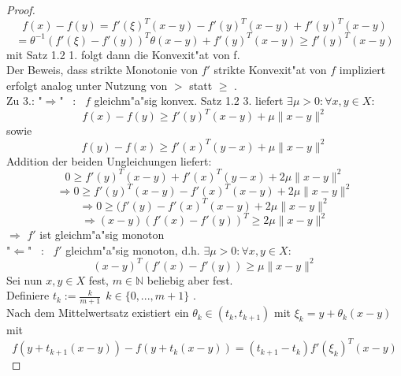 \begin{proof}
		\begin{equation*}
		f(x)-f(y)=f'(\xi)^T(x-y)-f'(y)^T(x-y)+f'(y)^T(x-y)
		\end{equation*}
		\begin{equation*}
		=\theta^{-1}(f'(\xi)-f'(y))^T\theta(x-y)+f'(y)^T(x-y) \geq f'(y)^T(x-y)
		\end{equation*}
		mit Satz 1.2 1. folgt dann die Konvexit"at von f. \\
		Der Beweis, dass strikte Monotonie von $f'$ strikte Konvexit"at von $f$ impliziert erfolgt analog unter Nutzung von \(>\) statt  \( \geq \) . \\
		Zu 3.: 
		"$\Rightarrow$" \ : \ $f$ gleichm"a"sig konvex. Satz 1.2 3. liefert $\exists \mu > 0 : \forall x,y \in X:$
		\begin{equation*}
		f(x)-f(y) \geq f'(y)^T(x-y)+\mu \| x-y \|^2
		\end{equation*}
		sowie
		\begin{equation*}
		f(y)-f(x) \geq f'(x)^T(y-x)+ \mu \| x-y \|^2
		\end{equation*}
		Addition der beiden Ungleichungen liefert:
		\begin{equation*} \label{key}
		0 \geq f'(y)^T(x-y)+f'(x)^T(y-x)+2 \mu \| x-y \|^2
		\end{equation*}
		\begin{equation*}
		\Rightarrow 0 \geq f'(y)^T(x-y)-f'(x)^T(x-y)+2\mu \| x-y \|^2
		\end{equation*}
		\begin{equation*}
		\Rightarrow 0 \geq (f'(y)-f'(x)^T(x-y)+2\mu \| x-y \|^2
		\end{equation*}
		\begin{equation*}
		\Rightarrow (x-y)(f'(x)-f'(y))^T \geq 2\mu \| x-y \|^2
		\end{equation*}
		$\Rightarrow$ $f'$ ist gleichm"a"sig monoton\\
		"$\Leftarrow$" \ : \ $f'$ gleichm"a"sig monoton, d.h. $\exists \mu > 0 :\forall x,y \in X:$
		\begin{equation*}
		(x-y)^T(f'(x)-f'(y)) \geq \mu \| x-y\|^2 
		\end{equation*}
		Sei nun $x,y \in X$ fest, $m \in \mathbb{N}$ beliebig aber fest. \\
		Definiere $t_k:= \frac{k}{m+1} \  \ k \in \{0,...,m+1\}$ .\\
		Nach dem Mittelwertsatz existiert ein  $\theta_k \in (t_k,t_{k+1}) $ mit $ \xi_k=y+\theta_k(x-y) $ mit
		\begin{equation*}
		f(y+t_{k+1}(x-y))-f(y+t_k(x-y))=(t_{k+1}-t_k)f'(\xi_k)^T(x-y)

\end{equation*}
\end{proof}
